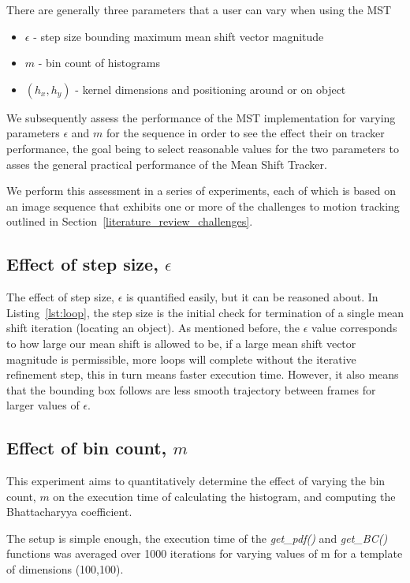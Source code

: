 There are generally three parameters that a user can vary when using the MST
\begin{itemize}
    \item $\epsilon$ - step size bounding maximum mean shift vector magnitude
    \item $m$ - bin count of histograms
    \item $(h_x,h_y)$ - kernel dimensions and positioning around or on object
\end{itemize}
We subsequently assess the performance of the MST implementation
for varying parameters $\epsilon$ and $m$ for the sequence in order to see the
effect their on tracker performance, the goal being to select reasonable values
for the two parameters to asses the general practical performance of the Mean
Shift Tracker. 

We perform this assessment in a series of experiments, each of which is based on an image
sequence that exhibits one or more of the challenges to motion tracking outlined
in Section~\ref{literature_review_challenges}. 
 
\subsection{Effect of step size, $\epsilon$}\label{results_eps}
The effect of step size, $\epsilon$ is quantified easily, but it can be reasoned
about. In Listing~\ref{lst:loop}, the step size is the initial check for
termination of a single mean shift iteration (locating an object). As mentioned
before, the $\epsilon$ value corresponds to how large our mean shift is allowed
to be, if a large mean shift vector magnitude is permissible, more loops will
complete without the iterative refinement step, this in turn means faster execution time.
However, it also means that the bounding box follows are less smooth
trajectory between frames for larger values of $\epsilon$.


\subsection{Effect of bin count, $m$}\label{results_m}
This experiment aims to quantitatively determine the effect of varying the
bin count, $m$ on the execution time of calculating the histogram, and computing
the Bhattacharyya coefficient.

The setup is simple enough, the execution time of the \textit{get\_pdf()} and
\textit{get\_BC()} functions was averaged over 1000 iterations for varying
values of m for a template of dimensions (100,100).

